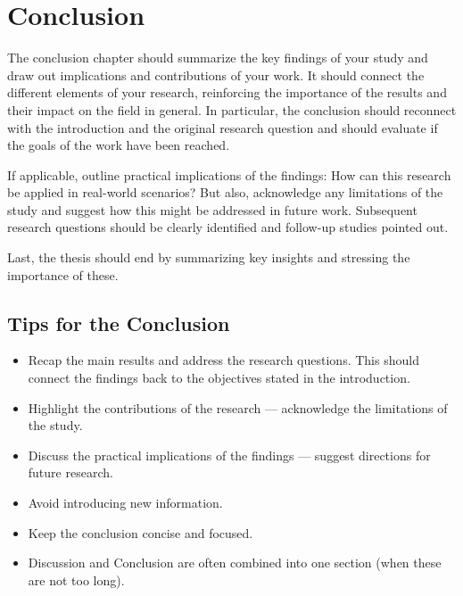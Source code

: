 \chapter{Conclusion}
\label{ch:conclusion}

The conclusion chapter should summarize the key findings of your study and draw out implications and contributions of your work. It should connect the different elements of your research, reinforcing the importance of the results and their impact on the field in general. In particular, the conclusion should reconnect with the introduction and the original research question and should evaluate if the goals of the work have been reached.

If applicable, outline practical implications of the findings: How can this research be applied in real-world scenarios? But also, acknowledge any limitations of the study and suggest how this might be addressed in future work. Subsequent research questions should be clearly identified and follow-up studies pointed out.

Last, the thesis should end by summarizing key insights and stressing the importance of these.

\section{Tips for the Conclusion}
\begin{itemize}
    \item Recap the main results and address the research questions. This should connect the findings back to the objectives stated in the introduction.
    \item Highlight the contributions of the research --- acknowledge the limitations of the study.
    \item Discuss the practical implications of the findings --- suggest directions for future research.
    \item Avoid introducing new information.
    \item Keep the conclusion concise and focused.
    \item Discussion and Conclusion are often combined into one section (when these are not too long).
\end{itemize}